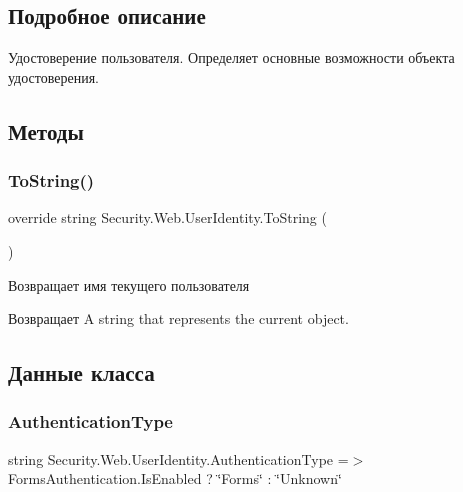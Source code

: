 \subsection{Подробное описание}
Удостоверение пользователя. Определяет основные возможности объекта удостоверения. 



\subsection{Методы}
\mbox{\label{class_security_1_1_web_1_1_user_identity_a000a7083c53a09f5a6d82ab9f16fc50c}} 
\subsubsection{\texorpdfstring{To\+String()}{ToString()}}
{\footnotesize\ttfamily override string Security.\+Web.\+User\+Identity.\+To\+String (\begin{DoxyParamCaption}{ }\end{DoxyParamCaption})}



Возвращает имя текущего пользователя 

\begin{DoxyReturn}{Возвращает}
A string that represents the current object. 
\end{DoxyReturn}


\subsection{Данные класса}
\mbox{\label{class_security_1_1_web_1_1_user_identity_a7cf0a542015f4dc80e657662d605c7ad}} 
\subsubsection{\texorpdfstring{Authentication\+Type}{AuthenticationType}}
{\footnotesize\ttfamily string Security.\+Web.\+User\+Identity.\+Authentication\+Type =$>$ Forms\+Authentication.\+Is\+Enabled ? \char`\"{}Forms\char`\"{} \+: \char`\"{}Unknown\char`\"{}}



